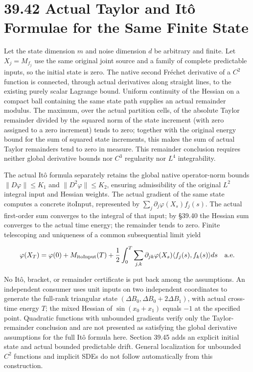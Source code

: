 \documentclass[
  english,
  11pt,
  oneside]{book}
\begin{document}
\section{39.42 Actual Taylor and Itô Formulae for the Same Finite State}\label{actual-taylor-and-ituxf4-formulae-for-the-same-finite-state}

Let the state dimension \(m\) and noise dimension \(d\) be arbitrary and finite. Let \(X_j=M_{f_j}\) use the same original joint source and a family of complete predictable inputs, so the initial state is zero. The native second Fréchet derivative of a \(C^2\) function is connected, through actual derivatives along straight lines, to the existing purely scalar Lagrange bound. Uniform continuity of the Hessian on a compact ball containing the same state path supplies an actual remainder modulus. The maximum, over the actual partition cells, of the absolute Taylor remainder divided by the squared norm of the state increment (with zero assigned to a zero increment) tends to zero; together with the original energy bound for the sum of squared state increments, this makes the sum of actual Taylor remainders tend to zero in measure. This remainder conclusion requires neither global derivative bounds nor \(C^3\) regularity nor \(L^4\) integrability.

The actual Itô formula separately retains the global native operator-norm bounds \(\|D\varphi\|\le K_1\) and \(\|D^2\varphi\|\le K_2\), ensuring admissibility of the original \(L^2\) integral input and Hessian weights. The actual gradient of the same state computes a concrete itoInput, represented by \(\sum_j\partial_j\varphi(X_s)f_j(s)\). The actual first-order sum converges to the integral of that input; by §39.40 the Hessian sum converges to the actual time energy; the remainder tends to zero. Finite telescoping and uniqueness of a common subsequential limit yield

\[\varphi(X_T)=\varphi(0)+M_{\rm itoInput}(T)
+\frac12\int_0^T\sum_{j,k}\partial_{jk}\varphi(X_s)
\langle f_j(s),f_k(s)\rangle ds
\quad\text{a.e.}\]

No Itô, bracket, or remainder certificate is put back among the assumptions. An independent consumer uses unit inputs on two independent coordinates to generate the full-rank triangular state \((\Delta B_0,\Delta B_0+2\Delta B_1)\), with actual cross-time energy \(T\); the mixed Hessian of \(\sin(x_0+x_1)\) equals \(-1\) at the specified point. Quadratic functions with unbounded gradients verify only the Taylor-remainder conclusion and are not presented as satisfying the global derivative assumptions for the full Itô formula here. Section 39.45 adds an explicit initial state and actual bounded predictable drift. General localization for unbounded \(C^2\) functions and implicit SDEs do not follow automatically from this construction.
\end{document}

